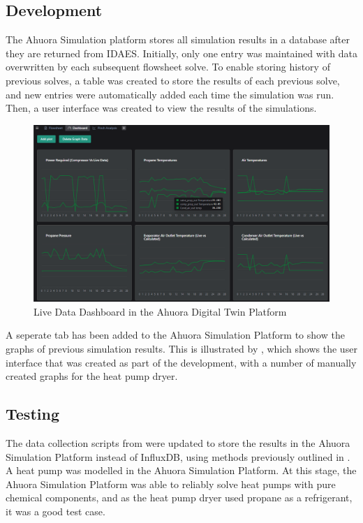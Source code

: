 \subsection{Development} \label{sec:recordinghistorydevelopment}

The Ahuora Simulation platform stores all simulation results in a database after they are returned from IDAES. Initially, only one entry was maintained with data overwritten by each subsequent flowsheet solve. To enable storing history of previous solves, a table was created to store the results of each previous solve, and new entries were automatically added each time the simulation was run. Then, a user interface was created to view the results of the simulations.


\begin{figure}
    \centering
    \includegraphics[width=\textwidth]{livedatadashboard.png}
    \caption{Live Data Dashboard in the Ahuora Digital Twin Platform}
    \label{fig:livedatadashboard}
\end{figure}

A seperate tab has been added to the Ahuora Simulation Platform to show the graphs of previous simulation results. This is illustrated by , which shows the user interface that was created as part of the development, with a number of manually created graphs for the heat pump dryer. 


\subsection{Testing}

The data collection scripts from  were updated to store the results in the Ahuora Simulation Platform instead of InfluxDB, using methods previously outlined in . A heat pump was modelled in the Ahuora Simulation Platform. At this stage, the Ahuora Simulation Platform was able to reliably solve heat pumps with pure chemical components, and as the heat pump dryer used propane as a refrigerant, it was a good test case. 



